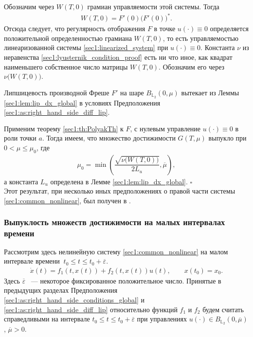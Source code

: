 \documentclass[../main.tex]{subfiles}
\begin{document}
Обозначим через  $W(T,0) $ грамиан управляемости этой системы.
Тогда 
\begin{gather}
    W(T,0) = F'(0) \big(F'(0)\big)^*.
\end{gather}
Отсюда следует, что  регулярность отображения  $F$ в точке $u(\cdot) \equiv 0$ определяется положительной определенностью грамиана  $W(T,0) $, то есть управляемостью линеаризованной системы \eqref{sec1:linearized_system} при $u(\cdot) \equiv 0$. 
Константа $\nu$ из неравенства \eqref{sec1:lyusternik_condition_proof} есть ни что иное, как квадрат наименьшего собственное число матрицы $W(T,0) $.
Обозначим его через $\nu\big(W(T,0)\big)$.
    
Липшицевость производной Фреше $F'$ на шаре $B_{\mathbb{L}_2}(0,\mu)$ вытекает из Леммы \ref{sec1:lem:lip_dx_global} в условиях Предположения \ref{sec1:as:right_hand_side_diff_lip}. 
    
Применим теорему \ref{sec1:th:PolyakTh} к $F$, с нулевым управление $u(\cdot) \equiv 0$ в роли точки $a$. 
Тогда имеем, что множество достижимости $G(T,\mu)$ выпукло при $ 0 < \mu \leqslant \mu_0 $, где  
\begin{gather}\label{sec1:mu0}
    \mu_0 = \min\left( \dfrac{\sqrt{\nu\big(W(T,0)\big)}}{2L_u}, \overline{\mu} \right), 
\end{gather}
а константа $L_u $ определена в Лемме  \ref{sec1:lem:lip_dx_global}. 
\hfill$\square$\\[1ex]%
Этот результат, при несколько иных предположениях о правой части системы \eqref{sec1:common_nonlinear}, был получен в \cite{Polyak2004}.
    
\subsubsection{Выпуклость множеств достижимости на малых интервалах времени}
Рассмотрим здесь нелинейную систему \eqref{sec1:common_nonlinear} на малом интервале времени $\ t_0 \leqslant t \leqslant t_0 + \overline{\varepsilon} $.
\begin{gather}\label{sec1:common_nonlinear_small_time}
    \dot{x}(t)=f_1(t,x(t))+f_2(t,x(t))u(t), \qquad x(t_0) = x_0.
\end{gather}
Здесь $ \overline{\varepsilon} $ ~--- некоторое фиксированное положительное число.
Принятые в предыдущих разделах Предположения \ref{sec1:as:right_hand_side_conditions_global} и \ref{sec1:as:right_hand_side_diff_lip} относительно функций $f_1$ и $f_2$ будем считать справедливыми на интервале $t_0 \leqslant t \leqslant t_0 + \overline{\varepsilon} $ при управлениях $u(\cdot) \in B_{\mathbb{L}_2}(0, \overline{\mu}) $, $\overline{\mu} > 0$.
   
\end{document}
